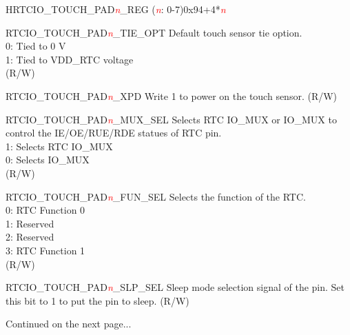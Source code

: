 \begin{register}{H}{RTCIO\_TOUCH\_PAD\textcolor{red}{\it{n}}\_REG (\textcolor{red}{\it{n}}: 0-7)}{0x94+4*\textcolor{red}{\it{n}}}
\begin{regdesc}
\begin{reglist}
\item [RTCIO\_TOUCH\_PAD\textcolor{red}{\it{n}}\_TIE\_OPT] Default touch sensor tie option. \\
0: Tied to 0 V\\
1: Tied to VDD\_RTC voltage\\
(R/W) 
\item [RTCIO\_TOUCH\_PAD\textcolor{red}{\it{n}}\_XPD] Write 1 to power on the touch sensor. (R/W)
\item [RTCIO\_TOUCH\_PAD\textcolor{red}{\it{n}}\_MUX\_SEL] Selects RTC IO\_MUX or IO\_MUX to control the IE/OE/RUE/RDE statues of RTC pin.\\
1: Selects RTC IO\_MUX\\
0: Selects IO\_MUX \\
(R/W)
\item [RTCIO\_TOUCH\_PAD\textcolor{red}{\it{n}}\_FUN\_SEL] Selects the function of the RTC.\\
0: RTC Function 0\\
1: Reserved\\
2: Reserved\\
3: RTC Function 1\\
(R/W)
\item[RTCIO\_TOUCH\_PAD\textcolor{red}{\it{n}}\_SLP\_SEL] Sleep mode selection signal of the pin. Set this bit to 1 to put the pin to sleep. (R/W)
\item [Continued on the next page...]
\end{reglist}\end{regdesc}
\end{register}
\addtocounter{Regfloat}{-1}
